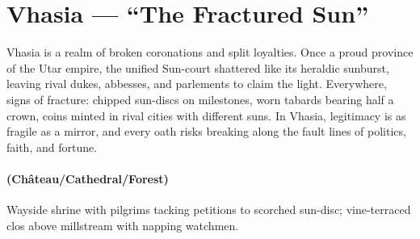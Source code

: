 \section{Vhasia --- ``The Fractured Sun''}
\label{chap:vhasia}

\begin{tcolorbox}[colback=black!3,colframe=black!40!white,title={Theme \& Atmosphere}]
Vhasia is a realm of broken coronations and split loyalties. Once a proud province of the Utar empire, the unified  Sun-court shattered like its heraldic sunburst, leaving rival dukes, abbesses, and parlements to claim the light. Everywhere, signs of fracture: chipped sun-discs on milestones, worn tabards bearing half a crown, coins minted in rival cities with different suns. In Vhasia,  legitimacy is as fragile as a mirror, and every oath risks breaking along the fault lines of politics, faith, and fortune.
\end{tcolorbox}

\paragraph*{(Château/Cathedral/Forest)} Wayside shrine with pilgrims tacking petitions to scorched sun-disc; vine-terraced clos above millstream with napping watchmen.

